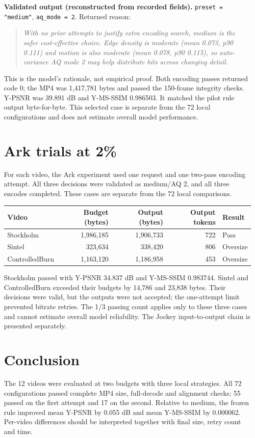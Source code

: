 \documentclass[10pt,a4paper]{article}
\begin{document}
\textbf{Validated output (reconstructed from recorded fields).} \texttt{preset = "medium"}, \texttt{aq\_mode = 2}. Returned reason:
\begin{quote}\small\itshape
With no prior attempts to justify extra encoding search, medium is the safer cost-effective choice. Edge density is moderate (mean 0.073, p90 0.111) and motion is also moderate (mean 0.078, p90 0.115), so auto-variance AQ mode 2 may help distribute bits across changing detail.
\end{quote}
This is the model's rationale, not empirical proof. Both encoding passes returned code 0; the MP4 was 1,417,781 bytes and passed the 150-frame integrity checks. Y-PSNR was 39.891 dB and Y-MS-SSIM 0.986503. It matched the pilot rule output byte-for-byte. This selected case is separate from the 72 local configurations and does not estimate overall model performance.


\clearpage
\section{Ark trials at 2\%}
For each video, the Ark experiment used one request and one two-pass encoding attempt. All three decisions were validated as medium/AQ 2, and all three encodes completed. These cases are separate from the 72 local comparisons.
\begin{center}\begin{tabular}{lrrrl}\hline
Video & Budget (bytes) & Output (bytes) & Output tokens & Result \\\hline
Stockholm & 1,986,185 & 1,906,733 & 722 & Pass \\
Sintel & 323,634 & 338,420 & 806 & Oversize \\
ControlledBurn & 1,163,120 & 1,186,958 & 453 & Oversize \\\hline
\end{tabular}\end{center}
Stockholm passed with Y-PSNR 34.837 dB and Y-MS-SSIM 0.983744. Sintel and ControlledBurn exceeded their budgets by 14,786 and 23,838 bytes. Their decisions were valid, but the outputs were not accepted; the one-attempt limit prevented bitrate retries. The 1/3 passing count applies only to these three cases and cannot estimate overall model reliability. The Jockey input-to-output chain is presented separately.


\section{Conclusion}
The 12 videos were evaluated at two budgets with three local strategies. All 72 configurations passed complete MP4 size, full-decode and alignment checks; 55 passed on the first attempt and 17 on the second. Relative to medium, the frozen rule improved mean Y-PSNR by 0.055 dB and mean Y-MS-SSIM by 0.000062. Per-video differences should be interpreted together with final size, retry count and time.
\end{document}
